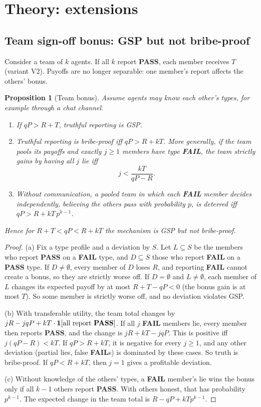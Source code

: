 \documentclass[11pt]{article}
\newtheorem{proposition}[theorem]{Proposition}
\theoremstyle{definition}
\theoremstyle{remark}
\newcommand{\PASS}{\textbf{PASS}}
\newcommand{\FAIL}{\textbf{FAIL}}
\newcommand{\1}{\mathbf{1}}
\begin{document}
\section{Theory: extensions}
\label{sec:extensions}

\subsection{Team sign-off bonus: GSP but not bribe-proof}

Consider a team of $k$ agents. If all $k$ report \PASS{}, each member receives $T$
(variant V2). Payoffs are no longer separable: one member's report affects the others'
bonus.

\begin{proposition}[Team bonus]\label{prop:team}
Assume agents may know each other's types, for example through a chat channel.
\begin{enumerate}[label=(\alph*)]
    \item If $qP>R+T$, truthful reporting is GSP.
    \item Truthful reporting is bribe-proof iff $qP>R+kT$. More generally, if the team
    pools its payoffs and exactly $j\ge1$ members have type \FAIL{}, the team strictly
    gains by having all $j$ lie iff
    \[
      j<\frac{kT}{qP-R}.
    \]
    \item Without communication, a pooled team in which each \FAIL{} member decides
    independently, believing the others pass with probability $p$, is deterred iff
    $qP>R+kT\,p^{k-1}$.
\end{enumerate}
Hence for $R+T<qP<R+kT$ the mechanism is GSP but not bribe-proof.
\end{proposition}

\begin{proof}
(a) Fix a type profile and a deviation by $S$. Let $L\subseteq S$ be the members who
report \PASS{} on a \FAIL{} type, and $D\subseteq S$ those who report \FAIL{} on a
\PASS{} type. If $D\ne\emptyset$, every member of $D$ loses $R$, and reporting \FAIL{}
cannot create a bonus, so they are strictly worse off. If $D=\emptyset$ and
$L\neq\emptyset$, each member of $L$ changes its expected payoff by at most
$R+T-qP<0$ (the bonus gain is at most $T$). So some member is strictly worse off, and no
deviation violates GSP.

(b) With transferable utility, the team total changes by
$jR - jqP + kT\cdot\1[\text{all report \PASS}]$. If all $j$ \FAIL{} members lie, every
member then reports \PASS{}, and the change is $jR+kT-jqP$. This is positive iff
$j(qP-R)<kT$. If $qP>R+kT$, it is negative for every $j\ge1$, and any other deviation
(partial lies, false \FAIL{}s) is dominated by these cases. So truth is bribe-proof. If
$qP<R+kT$, then $j=1$ gives a profitable deviation.

(c) Without knowledge of the others' types, a \FAIL{} member's lie wins the bonus only if
all $k-1$ others report \PASS{}. With others honest, that has probability $p^{k-1}$. The
expected change in the team total is $R-qP+kTp^{k-1}$.
\end{proof}
\end{document}
